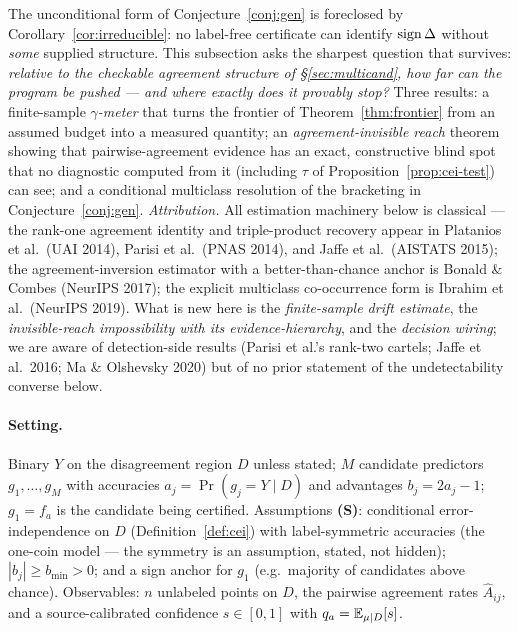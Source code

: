 
The unconditional form of Conjecture~\ref{conj:gen} is foreclosed by
Corollary~\ref{cor:irreducible}: no label-free certificate can identify
$\operatorname{sign}\Delta$ without \emph{some} supplied structure. This subsection asks the
sharpest question that survives: \emph{relative to the checkable agreement
structure of \S\ref{sec:multicand}, how far can the program be pushed --- and
where exactly does it provably stop?} Three results: a finite-sample
\emph{$\gamma$-meter} that turns the frontier of Theorem~\ref{thm:frontier}
from an assumed budget into a measured quantity; an \emph{agreement-invisible
reach} theorem showing that pairwise-agreement evidence has an exact,
constructive blind spot that no diagnostic computed from it (including
$\tau$ of Proposition~\ref{prop:cei-test}) can see; and a conditional
multiclass resolution of the bracketing in Conjecture~\ref{conj:gen}.
\emph{Attribution.} All estimation machinery below is classical ---
the rank-one agreement identity and triple-product recovery appear in
Platanios et al.\ (UAI 2014), Parisi et al.\ (PNAS 2014), and Jaffe et al.\
(AISTATS 2015); the agreement-inversion estimator with a better-than-chance
anchor is Bonald \& Combes (NeurIPS 2017); the explicit multiclass
co-occurrence form is Ibrahim et al.\ (NeurIPS 2019). What is new here is the
\emph{finite-sample drift estimate}, the \emph{invisible-reach impossibility
with its evidence-hierarchy}, and the \emph{decision wiring}; we are aware of
detection-side results (Parisi et al.'s rank-two cartels; Jaffe et al.\ 2016;
Ma \& Olshevsky 2020) but of no prior statement of the undetectability
converse below.

\paragraph{Setting.} Binary $Y$ on the disagreement region $D$ unless stated;
$M$ candidate predictors $g_1,\dots,g_M$ with accuracies
$a_j=\Pr(g_j{=}Y\mid D)$ and advantages $b_j=2a_j-1$; $g_1=f_a$ is the
candidate being certified. Assumptions \textbf{(S)}: conditional
error-independence on $D$ (Definition~\ref{def:cei}) with label-symmetric
accuracies (the one-coin model --- the symmetry is an assumption, stated, not
hidden); $|b_j|\ge b_{\min}>0$; and a sign anchor for $g_1$ (e.g.\ majority of
candidates above chance). Observables: $n$ unlabeled points on $D$, the
pairwise agreement rates $\hat A_{ij}$, and a source-calibrated confidence
$s\in[0,1]$ with $q_a=\mathbb{E}_{\mu|D}[s]$.

